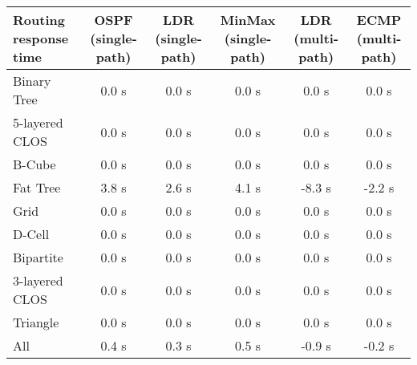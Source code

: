 \begin{tabular}{l|ccccc}
Routing response time & OSPF (single-path) & LDR (single-path) & MinMax (single-path) & LDR (multi-path) & ECMP (multi-path) \\
\hline
Binary Tree           & 0.0 s              & 0.0 s             & 0.0 s                & 0.0 s            & 0.0 s             \\
5-layered CLOS        & 0.0 s              & 0.0 s             & 0.0 s                & 0.0 s            & 0.0 s             \\
B-Cube                & 0.0 s              & 0.0 s             & 0.0 s                & 0.0 s            & 0.0 s             \\
Fat Tree              & 3.8 s              & 2.6 s             & 4.1 s                & -8.3 s           & -2.2 s            \\
Grid                  & 0.0 s              & 0.0 s             & 0.0 s                & 0.0 s            & 0.0 s             \\
D-Cell                & 0.0 s              & 0.0 s             & 0.0 s                & 0.0 s            & 0.0 s             \\
Bipartite             & 0.0 s              & 0.0 s             & 0.0 s                & 0.0 s            & 0.0 s             \\
3-layered CLOS        & 0.0 s              & 0.0 s             & 0.0 s                & 0.0 s            & 0.0 s             \\
Triangle              & 0.0 s              & 0.0 s             & 0.0 s                & 0.0 s            & 0.0 s             \\
All                   & 0.4 s              & 0.3 s             & 0.5 s                & -0.9 s           & -0.2 s            \\
\end{tabular}